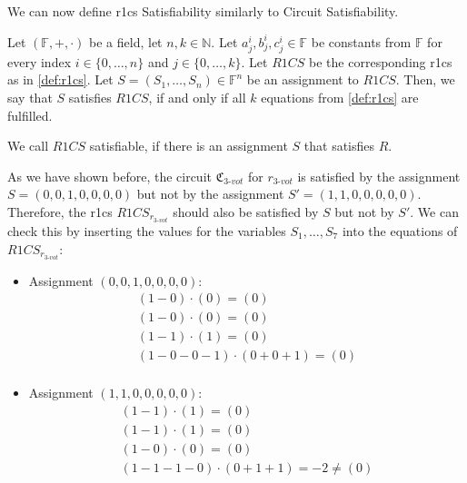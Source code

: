 We can now define \gls{r1cs} Satisfiability similarly to Circuit Satisfiability.

\begin{definition}
    \label{def:r1csSat}
    Let $(\mathbb{F},+,\cdot )$ be a field, let $n,k\in\mathbb{N}$.
    Let $a_j^i,b_j^i,c_j^i\in\mathbb{F}$ be constants from $\mathbb{F}$ for every index $i\in\{0,\dots, n\}$ and $j\in\{0,\dots, k\}$.
    Let $R1CS$ be the corresponding \gls{r1cs} as in \cref{def:r1cs}.
    Let $S=(S_1,\dots, S_n)\in\mathbb{F}^{n}$ be an assignment to $R1CS$.
    Then, we say that $S$ satisfies $R1CS$, if and only if all $k$ equations from \cref{def:r1cs} are fulfilled.    

    We call $R1CS$ satisfiable, if there is an assignment $S$ that satisfies $R$.
\end{definition}

As we have shown before, the circuit $\mathfrak{C}_{3\text{-}vot}$ for $r_{3\text{-}vot}$ is satisfied by the assignment $S=(0,0,1,0,0,0,0)$ but not by the assignment $S'=(1,1,0,0,0,0,0)$.
Therefore, the \gls{r1cs} $R1CS_{r_{3\text{-}vot}}$ should also be satisfied by $S$ but not by $S'$.
We can check this by inserting the values for the variables $S_1,\dots, S_7$ into the equations of $R1CS_{r_{3\text{-}vot}}$:
\begin{itemize}
    \item Assignment $(0,0,1,0,0,0,0)$:
    \begin{align*}
        \left(1-0\right)\cdot \left(0\right) = \left(0\right)\\
        \left(1-0\right)\cdot \left(0\right) = \left(0\right)\\
        \left(1-1\right)\cdot \left(1\right) = \left(0\right)\\
        \left(1-0-0-1\right)\cdot \left(0+0+1\right) = \left(0\right)\\
    \end{align*}
    \item Assignment $(1,1,0,0,0,0,0)$:
    \begin{align*}
        \left(1-1\right)\cdot \left(1\right) = \left(0\right)\\
        \left(1-1\right)\cdot \left(1\right) = \left(0\right)\\
        \left(1-0\right)\cdot \left(0\right) = \left(0\right)\\
        \left(1-1-1-0\right)\cdot \left(0+1+1\right) = -2 \neq \left(0\right)\\
    \end{align*}
\end{itemize}

